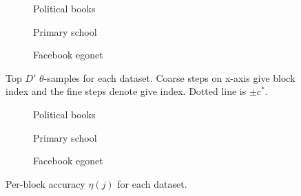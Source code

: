 \begin{figure}[!ht]
	\centering
	\begin{subfigure}{0.32\linewidth}
		\centering
		\caption{Political books}
		\label{fig:polbooks-null}
	\end{subfigure}
	\begin{subfigure}{0.32\linewidth}
		\centering
		\caption{Primary school}
		\label{fig:school-null}
	\end{subfigure}
	\begin{subfigure}{0.32\linewidth}
		\centering
		\caption{Facebook egonet}
		\label{fig:fb-null}
	\end{subfigure}
	\caption{Top $D'$ $\theta$-samples for each dataset. Coarse steps on x-axis give block index and the fine steps denote give index. Dotted line is $\pm c^*$.}
\end{figure}
%
\begin{figure}[!ht]
	\centering
	\begin{subfigure}{0.32\linewidth}
		\centering
		\caption{Political books}
		\label{fig:polbooks-accuracy}
	\end{subfigure}
	\begin{subfigure}{0.32\linewidth}
		\centering
		\caption{Primary school}
		\label{fig:school-accuracy}
	\end{subfigure}
	\begin{subfigure}{0.32\linewidth}
		\centering
		\caption{Facebook egonet}
		\label{fig:fb-accuracy}
	\end{subfigure}
	\caption{Per-block accuracy $\eta(j)$ for each dataset.}
\end{figure}
\FloatBarrier
